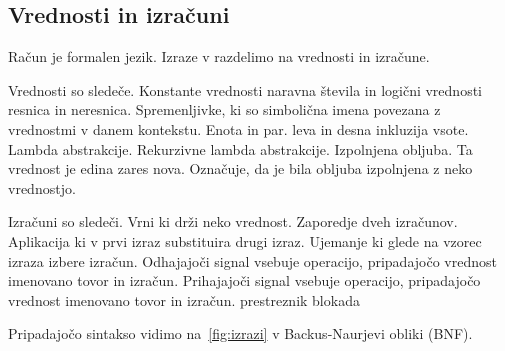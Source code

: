 \documentclass[12pt,a4paper,twoside]{article}
\theoremstyle{definition} %
\theoremstyle{plain} %
\numberwithin{equation}{section}  %
\begin{document}
\subsection{Vrednosti in izračuni}

Račun \lae{} je formalen jezik. Izraze v \lae{} razdelimo na vrednosti in izračune. 


Vrednosti so sledeče.
Konstante vrednosti naravna števila in logični vrednosti resnica in neresnica.
Spremenljivke, ki so simbolična imena povezana z vrednostmi v danem kontekstu.
Enota in par.
leva in desna inkluzija vsote.
Lambda abstrakcije.
Rekurzivne lambda abstrakcije.
Izpolnjena obljuba. Ta vrednost je edina zares nova. Označuje, da je bila obljuba izpolnjena z neko vrednostjo.


Izračuni so sledeči.
Vrni ki drži neko vrednost.
Zaporedje dveh izračunov.
Aplikacija ki v prvi izraz substituira drugi izraz.
Ujemanje ki glede na vzorec izraza izbere izračun. 
Odhajajoči signal vsebuje operacijo, pripadajočo vrednost imenovano tovor in izračun.
Prihajajoči signal vsebuje operacijo, pripadajočo vrednost imenovano tovor in izračun.
prestreznik 
blokada


Pripadajočo sintakso vidimo na~\ref{fig:izrazi} v Backus-Naurjevi obliki (BNF).




\end{document}
